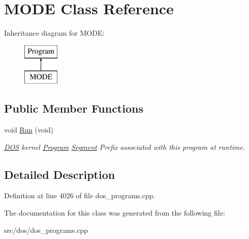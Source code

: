 \hypertarget{classMODE}{\section{M\-O\-D\-E Class Reference}
\label{classMODE}
}
Inheritance diagram for M\-O\-D\-E\-:\begin{figure}[H]
\begin{center}
\leavevmode
\includegraphics[height=2.000000cm]{classMODE}
\end{center}
\end{figure}
\subsection*{Public Member Functions}
\begin{DoxyCompactItemize}
\item 
\hypertarget{classMODE_ae1eafc4abaabb5f647bff778f0e78215}{void \hyperlink{classMODE_ae1eafc4abaabb5f647bff778f0e78215}{Run} (void)}\label{classMODE_ae1eafc4abaabb5f647bff778f0e78215}

\begin{DoxyCompactList}\small\item\em \hyperlink{classDOS}{D\-O\-S} kernel \hyperlink{classProgram}{Program} \hyperlink{structSegment}{Segment} Prefix associated with this program at runtime. \end{DoxyCompactList}\end{DoxyCompactItemize}


\subsection{Detailed Description}


Definition at line 4026 of file dos\-\_\-programs.\-cpp.



The documentation for this class was generated from the following file\-:\begin{DoxyCompactItemize}
\item 
src/dos/dos\-\_\-programs.\-cpp\end{DoxyCompactItemize}
